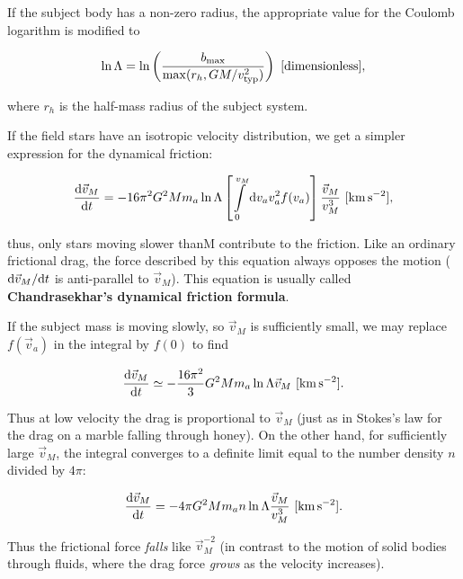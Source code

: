 \documentclass[a4paper,10pt]{article}
\begin{document}
{\noindent}If the subject body has a non-zero radius, the appropriate value for the Coulomb logarithm is modified to

\begin{align*}
    \ln\Lambda = \ln \left(\frac{b_{\rm max}}{{\rm max}(r_h,GM/v_{\rm typ}^2)}\right) ~ [{\rm dimensionless}],
\end{align*}

{\noindent}where $r_h$ is the half-mass radius of the subject system.

{\noindent}If the field stars have an isotropic velocity distribution, we get a simpler expression for the dynamical friction:

\begin{align*}
    \frac{{\rm d}\vec{v}_M}{{\rm d}t} = -16\pi^2G^2Mm_a\ln\Lambda \left[\int\limits_0^{v_M} {\rm d}v_a v_a^2f(v_a)\right]\frac{\vec{v}_M}{v_M^3} ~ [{\rm km\,s^{-2}}],
\end{align*}

{\noindent}thus, only stars moving slower than$ $M contribute to the friction. Like an ordinary frictional drag, the force described by this equation always opposes the motion (${\rm d}\vec{v}_M/{\rm d}t$ is anti-parallel to $\vec{v}_M$). This equation is usually called \textbf{Chandrasekhar's dynamical friction formula}.

{\noindent}If the subject mass is moving slowly, so $\vec{v}_M$ is sufficiently small, we may replace $f(\vec{v}_a)$ in the integral by $f(0)$ to find

\begin{align*}
    \frac{{\rm d}\vec{v}_M}{{\rm d}t} \simeq -\frac{16\pi^2}{3} G^2Mm_a\ln\Lambda \vec{v}_M ~ [{\rm km\,s^{-2}}].
\end{align*}

{\noindent}Thus at low velocity the drag is proportional to $\vec{v}_M$ (just as in Stokes's law for the drag on a marble falling through honey). On the other hand, for sufficiently large $\vec{v}_M$, the integral converges to a definite limit equal to the number density $n$ divided by $4\pi$:

\begin{align*}
    \frac{{\rm d}\vec{v}_M}{{\rm d}t} = -4\pi G^2Mm_an\ln\Lambda \frac{\vec{v}_M}{v_M^3} ~ [{\rm km\,s^{-2}}].
\end{align*}

{\noindent}Thus the frictional force \textit{falls} like $\vec{v}_M^{-2}$ (in contrast to the motion of solid bodies through fluids, where the drag force \textit{grows} as the velocity increases).
\end{document}
